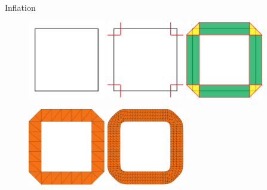 \begin{frame}{Inflation}
\begin{figure}
\centering
\hspace{\fill}
\includegraphics[width=0.3\textwidth]{Images/inflation_0.pdf}
\hspace{\fill}
\pause \includegraphics[width=0.3\textwidth]{Images/inflation_1.pdf}
\hspace{\fill}
\pause \includegraphics[width=0.3\textwidth]{Images/inflation_2.pdf}
\hspace{\fill}

\vspace{3mm}
\hspace{\fill}
\pause \includegraphics[width=0.3\textwidth]{Images/inflation_3.pdf}
\hspace{\fill}
\pause \includegraphics[width=0.3\textwidth]{Images/inflation_4.pdf}
\hspace{\fill}
\end{figure}
\end{frame}

